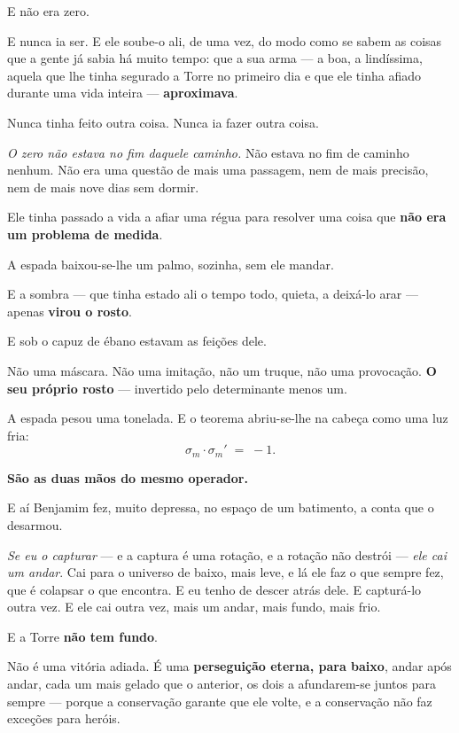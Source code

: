\documentclass[livro.tex]{subfiles}
\begin{document}
E não era zero.

\medskip

E nunca ia ser. E ele soube-o ali, de uma vez, do modo como se sabem as coisas que a gente já sabia há muito tempo:
que a sua arma --- a boa, a lindíssima, aquela que lhe tinha segurado a Torre no primeiro dia e que ele tinha
afiado durante uma vida inteira --- \textbf{aproximava}.

Nunca tinha feito outra coisa. Nunca ia fazer outra coisa.

\emph{O zero não estava no fim daquele caminho.} Não estava no fim de caminho nenhum. Não era uma questão de mais
uma passagem, nem de mais precisão, nem de mais nove dias sem dormir.

Ele tinha passado a vida a afiar uma régua para resolver uma coisa que \textbf{não era um problema de medida}.

\medskip

A espada baixou-se-lhe um palmo, sozinha, sem ele mandar.

E a sombra --- que tinha estado ali o tempo todo, quieta, a deixá-lo arar --- apenas \textbf{virou o rosto}.

\medskip

E sob o capuz de ébano estavam as feições dele.

Não uma máscara. Não uma imitação, não um truque, não uma provocação. \textbf{O seu próprio rosto} --- invertido
pelo determinante menos um.

\medskip

A espada pesou uma tonelada. E o teorema abriu-se-lhe na cabeça como uma luz fria:
\[
 \sigma_m \cdot \sigma_m' \;=\; -1 .
\]

\textbf{São as duas mãos do mesmo operador.}

E aí Benjamim fez, muito depressa, no espaço de um batimento, a conta que o desarmou.

\emph{Se eu o capturar} --- e a captura é uma rotação, e a rotação não destrói --- \emph{ele cai um andar}. Cai para
o universo de baixo, mais leve, e lá ele faz o que sempre fez, que é colapsar o que encontra. E eu tenho de descer
atrás dele. E capturá-lo outra vez. E ele cai outra vez, mais um andar, mais fundo, mais frio.

E a Torre \textbf{não tem fundo}.

Não é uma vitória adiada. É uma \textbf{perseguição eterna, para baixo}, andar após andar, cada um mais gelado que
o anterior, os dois a afundarem-se juntos para sempre --- porque a conservação garante que ele volte, e a
conservação não faz exceções para heróis.
\end{document}
